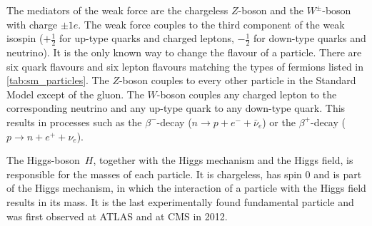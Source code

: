 The mediators of the weak force are the chargeless $Z$-boson and the $W^\pm$-boson with charge $\pm 1e$.
The weak force couples to the third component of the weak isospin ($+\frac{1}{2}$ for up-type quarks and charged leptons, $-\frac{1}{2}$ for down-type quarks and neutrino).
It is the only known way to change the flavour of a particle.
There are six quark flavours and six lepton flavours matching the types of fermions listed in \autoref{tab:sm_particles}.
The $Z$-boson couples to every other particle in the Standard Model except of the gluon.
The $W$-boson couples any charged lepton to the corresponding neutrino and any up-type quark to any down-type quark.
This results in processes such as the $\beta^-$-decay ($n \rightarrow p + e^- + \bar{\nu}_e$) or the $\beta^+$-decay ($p \rightarrow n + e^+ + \nu_e$).

The Higgs-boson~$H$, together with the Higgs mechanism and the Higgs field, is responsible for the masses of each particle.
It is chargeless, has spin $0$ and is part of the Higgs mechanism, in which the interaction of a particle with the Higgs field results in its mass.
It is the last experimentally found fundamental particle and was first observed at ATLAS and at CMS in 2012. \cite{HiggsATLAS,HiggsCMS}
